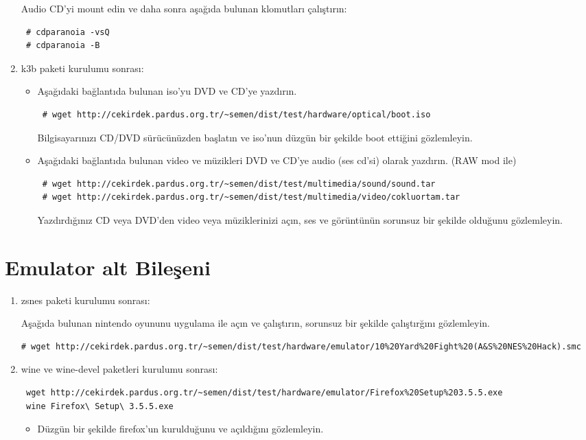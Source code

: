 \documentclass[a4paper,10pt]{article}
\begin{document}
\begin{enumerate}
Audio CD'yi mount edin ve daha sonra aşağıda bulunan klomutları çalıştırın:
\begin{verbatim}
 # cdparanoia -vsQ
 # cdparanoia -B
\end{verbatim}

\item k3b paketi kurulumu sonrası:
\begin{itemize}
\item Aşağıdaki bağlantıda bulunan iso'yu DVD ve CD'ye yazdırın. 
\begin{verbatim}
 # wget http://cekirdek.pardus.org.tr/~semen/dist/test/hardware/optical/boot.iso
\end{verbatim}

Bilgisayarınızı CD/DVD sürücünüzden başlatın ve iso'nun düzgün bir şekilde boot ettiğini gözlemleyin.

\item Aşağıdaki bağlantıda bulunan video ve müzikleri DVD ve CD'ye audio (ses cd'si) olarak yazdırın. (RAW mod ile)
\begin{verbatim}
 # wget http://cekirdek.pardus.org.tr/~semen/dist/test/multimedia/sound/sound.tar
 # wget http://cekirdek.pardus.org.tr/~semen/dist/test/multimedia/video/cokluortam.tar
\end{verbatim}
Yazdırdığınız CD veya DVD'den video veya müziklerinizi açın, ses ve görüntünün sorunsuz bir şekilde olduğunu gözlemleyin.

\end{itemize}

\end{enumerate}
\section{Emulator alt Bileşeni}
\begin{enumerate}
 \item zsnes paketi kurulumu sonrası:

Aşağıda bulunan nintendo oyununu uygulama ile açın ve çalıştırın, sorunsuz bir şekilde çalıştırğını gözlemleyin.
\begin{verbatim}
# wget http://cekirdek.pardus.org.tr/~semen/dist/test/hardware/emulator/10%20Yard%20Fight%20(A&S%20NES%20Hack).smc 
\end{verbatim}

 \item wine ve wine-devel paketleri kurulumu sonrası:
\begin{verbatim}
 wget http://cekirdek.pardus.org.tr/~semen/dist/test/hardware/emulator/Firefox%20Setup%203.5.5.exe
 wine Firefox\ Setup\ 3.5.5.exe
\end{verbatim}
\begin{itemize}
 \item Düzgün bir şekilde firefox'un kurulduğunu ve açıldığını gözlemleyin.
 \end{itemize}

\end{enumerate}
\end{document}
